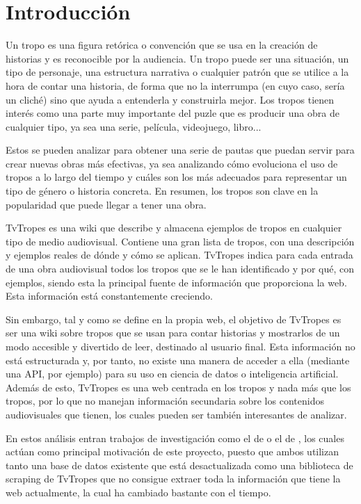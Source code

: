 \chapter{Introducción}

Un tropo es una figura retórica o convención que se usa en la creación de historias y es reconocible por la audiencia. Un tropo puede ser una situación, un tipo de personaje, una estructura narrativa o cualquier patrón que se utilice a la hora de contar una historia, de forma que no la interrumpa (en cuyo caso, sería un cliché) sino que ayuda a entenderla y construirla mejor. Los tropos tienen interés como una parte muy importante del puzle que es producir una obra de cualquier tipo, ya sea una serie, película, videojuego, libro... 

Estos se pueden analizar para obtener una serie de pautas que puedan servir para crear nuevas obras más efectivas, ya sea analizando cómo evoluciona el uso de tropos a lo largo del tiempo y cuáles son los más adecuados para representar un tipo de género o historia concreta. En resumen, los tropos son clave en la popularidad que puede llegar a tener una obra. 

TvTropes \cite{tvtropes} es una wiki que describe y almacena ejemplos de tropos en cualquier tipo de medio audiovisual. Contiene una gran lista de tropos, con una descripción y ejemplos reales de dónde y cómo se aplican. TvTropes indica para cada entrada de una obra audiovisual todos los tropos que se le han identificado y por qué, con ejemplos, siendo esta la principal fuente de información que proporciona la web. Esta información está constantemente creciendo.

Sin embargo, tal y como se define en la propia web, el objetivo de TvTropes es ser una wiki sobre tropos que se usan para contar historias y mostrarlos de un modo accesible y divertido de leer, destinado al usuario final. Esta información no está estructurada y, por tanto, no existe una manera de acceder a ella (mediante una API, por ejemplo) para su uso en ciencia de datos o inteligencia artificial. Además de esto, TvTropes es una web centrada en los tropos y nada más que los tropos, por lo que no manejan información secundaria sobre los contenidos audiovisuales que tienen, los cuales pueden ser también interesantes de analizar.

En estos análisis entran trabajos de investigación como el de \cite{garcia2020tropes} o el de \cite{tfgantoniogamiz}, los cuales actúan como principal motivación de este proyecto, puesto que ambos utilizan tanto una base de datos existente que está desactualizada como una biblioteca de scraping de TvTropes que no consigue extraer toda la información que tiene la web actualmente, la cual ha cambiado bastante con el tiempo.

